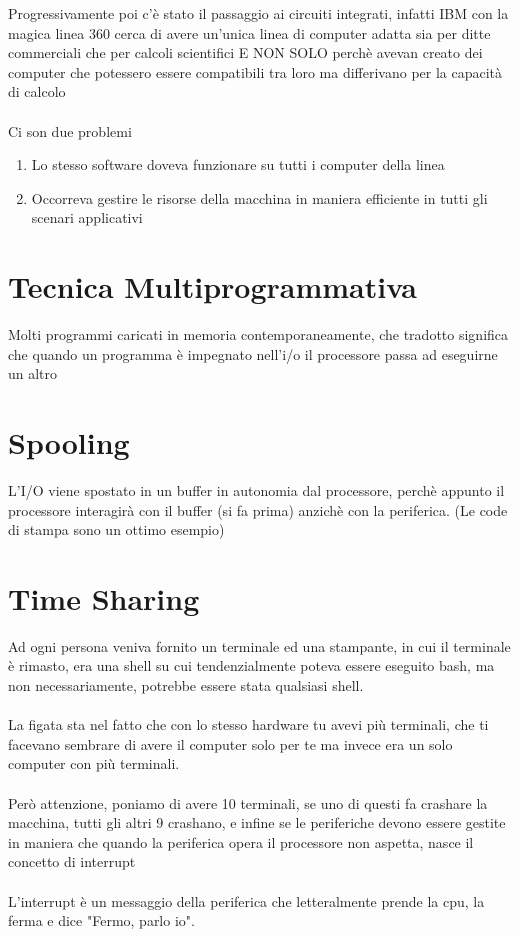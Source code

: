 \documentclass[12pt, a4paper, openany, twoside]{book}
\begin{document}
Progressivamente poi c'è stato il passaggio ai circuiti integrati, infatti
IBM con la magica linea 360 cerca di avere un'unica linea di computer adatta 
sia per ditte commerciali che per calcoli scientifici E NON SOLO perchè avevan
creato dei computer che potessero essere compatibili tra loro ma differivano
per la capacità di calcolo \\ \\
Ci son due problemi
\begin{enumerate}
	\item Lo stesso software doveva funzionare su tutti i computer della linea
	\item Occorreva gestire le risorse della macchina in maniera efficiente in 
	tutti gli scenari applicativi
\end{enumerate}
\section{Tecnica Multiprogrammativa}
Molti programmi caricati in memoria contemporaneamente, che tradotto significa 
che quando un programma è impegnato nell'i/o il processore passa ad eseguirne
un altro
\section{Spooling}
L'I/O viene spostato in un buffer in autonomia dal processore, perchè appunto
il processore interagirà con il buffer (si fa prima) anzichè con la periferica.
(Le code di stampa sono un ottimo esempio)
\section{Time Sharing}
Ad ogni persona veniva fornito un terminale ed una stampante, in cui il terminale
è rimasto, era una shell su cui tendenzialmente poteva essere eseguito bash, ma
non necessariamente, potrebbe essere stata qualsiasi shell. \\ \\
La figata sta nel fatto che con lo stesso hardware tu avevi più terminali, che
ti facevano sembrare di avere il computer solo per te ma invece era un solo
computer con più terminali. \\ \\ 
Però attenzione, poniamo di avere 10 terminali, se uno di questi fa crashare
la macchina, tutti gli altri 9 crashano, e infine se le periferiche devono
essere gestite in maniera che quando la periferica opera il processore non 
aspetta, nasce il concetto di interrupt \\ \\
L'interrupt è un messaggio della periferica che letteralmente prende la cpu, la
ferma e dice "Fermo, parlo io".
\end{document}
